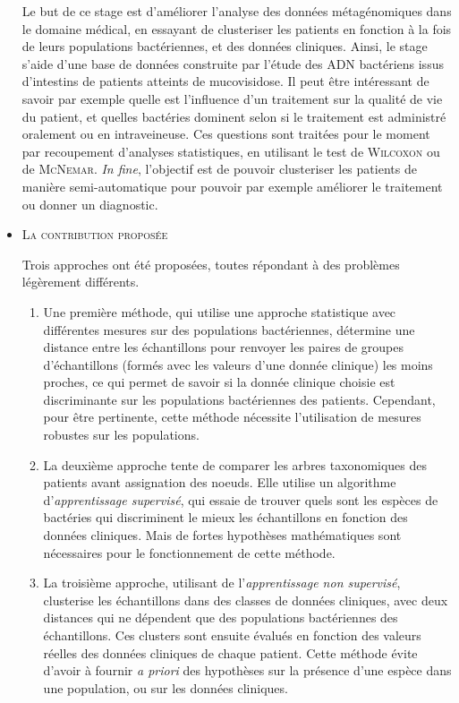 \documentclass{report}
\begin{document}
\begin{itemize}
Le but de ce stage est d'améliorer l'analyse des données métagénomiques dans le domaine médical, en essayant de clusteriser les patients en fonction à la fois de leurs populations bactériennes, et des données cliniques. Ainsi, le stage s'aide d'une base de données construite par l'étude des \textsc{ADN} bactériens issus d'intestins de patients atteints de mucovisidose. Il peut être intéressant de savoir par exemple quelle est l'influence d'un traitement sur la qualité de vie du patient, et quelles bactéries dominent selon si le traitement est administré oralement ou en intraveineuse. Ces questions sont traitées pour le moment par recoupement d'analyses statistiques, en utilisant le test de \textsc{Wilcoxon} ou de \textsc{McNemar}. \emph{In fine}, l'objectif est de pouvoir clusteriser les patients de manière semi-automatique pour pouvoir par exemple améliorer le traitement ou donner un diagnostic.

\item \textsc{La contribution proposée}

Trois approches ont été proposées, toutes répondant à des problèmes légèrement différents.\\

\begin{enumerate}
\item Une première méthode, qui utilise une approche statistique avec différentes mesures sur des populations bactériennes, détermine une distance entre les échantillons pour renvoyer les paires de groupes d'échantillons (formés avec les valeurs d'une donnée clinique) les moins proches, ce qui permet de savoir si la donnée clinique choisie est discriminante sur les populations bactériennes des patients. Cependant, pour être pertinente, cette méthode nécessite l'utilisation de mesures robustes sur les populations.
\item La deuxième approche tente de comparer les arbres taxonomiques des patients avant assignation des noeuds. Elle utilise un algorithme d'\emph{apprentissage supervisé}, qui essaie de trouver quels sont les espèces de bactéries qui discriminent le mieux les échantillons en fonction des données cliniques. Mais de fortes hypothèses mathématiques sont nécessaires pour le fonctionnement de cette méthode.
\item La troisième approche, utilisant de l'\emph{apprentissage non supervisé}, clusterise les échantillons dans des classes de données cliniques, avec deux distances qui ne dépendent que des populations bactériennes des échantillons. Ces clusters sont ensuite évalués en fonction des valeurs réelles des données cliniques de chaque patient. Cette méthode évite d'avoir à fournir \emph{a priori} des hypothèses sur la présence d'une espèce dans une population, ou sur les données cliniques.
\end{enumerate}


\end{itemize}
\end{document}
